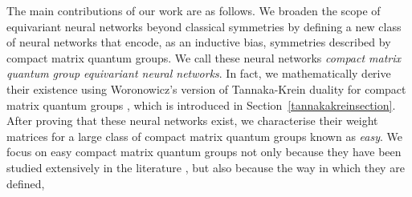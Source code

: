 \documentclass{article}
\theoremstyle{plain}
\theoremstyle{definition}
\theoremstyle{remark}
\begin{document}
The main contributions of our work are as follows.
We broaden the scope of equivariant neural networks beyond classical symmetries
by defining a new class of neural networks 
that encode, as an inductive bias, 
symmetries 
described by compact matrix quantum groups.
We call these neural networks 
\textit{compact matrix quantum group equivariant neural networks}.
In fact, we mathematically derive their existence using Woronowicz's version of 
Tannaka-Krein duality for compact matrix quantum groups \citep{woronowicz1988}, 
which is introduced in Section~\ref{tannakakreinsection}.
After proving that these neural networks exist,
we characterise their weight matrices for
a large class of compact matrix quantum groups known as \textit{easy}.
We focus on easy compact matrix quantum groups 
not only because they have
been studied extensively in the literature 
\citep{banica, banica2010, weber2013, freslonweber2016, raum2016, tarrago2016, weber2017, tarrago2018, gromada2020, freslon2023},
but also because the way in which they are defined, 
\end{document}
